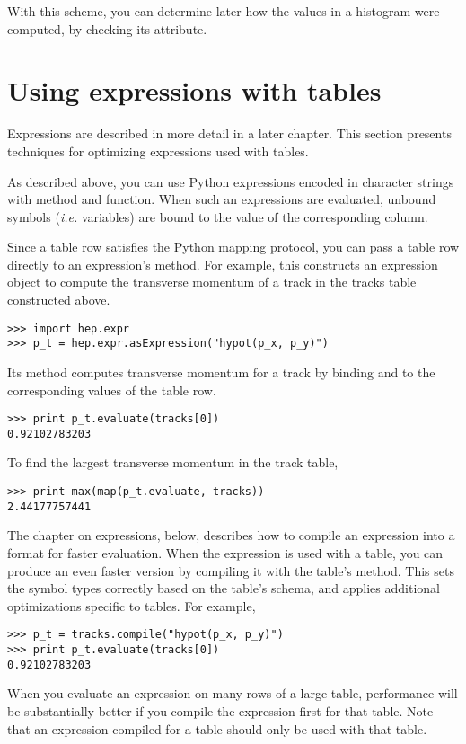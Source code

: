 With this scheme, you can determine later how the values in a histogram
were computed, by checking its  attribute.


\section{Using expressions with tables}

Expressions are described in more detail in a later chapter.  This
section presents techniques for optimizing expressions used with tables.

As described above, you can use Python expressions encoded in character
strings with  method and 
function.  When such an expressions are evaluated, unbound symbols
(\textit{i.e.} variables) are bound to the value of the corresponding
column.

Since a table row satisfies the Python mapping protocol, you can pass a
table row directly to an expression's  method.  For
example, this constructs an expression object to compute the transverse
momentum of a track in the tracks table constructed above.
\begin{verbatim}
>>> import hep.expr
>>> p_t = hep.expr.asExpression("hypot(p_x, p_y)")
\end{verbatim}
Its  method computes transverse momentum for a track by
binding  and  to the corresponding values of the table
row. 
\begin{verbatim}
>>> print p_t.evaluate(tracks[0])
0.92102783203
\end{verbatim}
To find the largest transverse momentum in the track table,
\begin{verbatim}
>>> print max(map(p_t.evaluate, tracks))
2.44177757441
\end{verbatim}

The chapter on expressions, below, describes how to compile an
expression into a format for faster evaluation.  When the expression is
used with a table, you can produce an even faster version by compiling
it with the table's  method.  This sets the symbol types
correctly based on the table's schema, and applies additional
optimizations specific to tables.  For example,
\begin{verbatim}
>>> p_t = tracks.compile("hypot(p_x, p_y)")
>>> print p_t.evaluate(tracks[0])
0.92102783203
\end{verbatim}
When you evaluate an expression on many rows of a large table,
performance will be substantially better if you compile the expression
first for that table.  Note that an expression compiled for a table
should only be used with that table.


